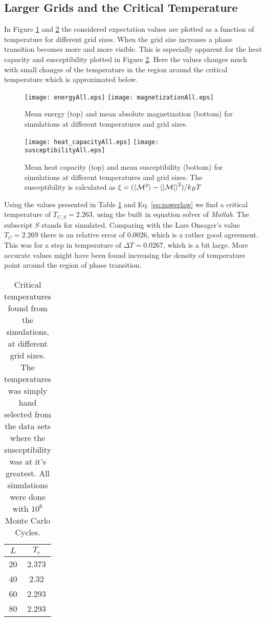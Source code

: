 \documentclass[11pt, a4paper]{article}
\begin{document}
\subsection{Larger Grids and the Critical Temperature}
In Figure \ref{fig:enmag} and \ref{fig:heatsus} the considered expectation values are plotted as a function of temperature for different grid sizes. When the grid size increases a phase transition becomes more and more visible. This is especially apparent for the heat capacity and susceptibility plotted in Figure \ref{fig:heatsus}. Here the values changes much with small changes of the temperature in the region around the critical temperature which is approximated below. 
\begin{figure}
\texttt{[image: energyAll.eps]}
\texttt{[image: magnetizationAll.eps]}
\caption{Mean energy (top) and mean absolute magnetization (bottom) for simulations at different temperatures and grid sizes.}
\label{fig:enmag}
\end{figure}

\begin{figure}
\texttt{[image: heat\_capacityAll.eps]}
\texttt{[image: susceptibilityAll.eps]}
\caption{Mean heat capacity (top) and mean susceptibility (bottom) for simulations at different temperatures and grid sizes. The susceptibility is calculated as $\xi = (\braket{{\cal M}^2} - \braket{|\cal M|}^2)/k_BT$}
\label{fig:heatsus}
\end{figure}

Using the values presented in Table \ref{tab:gridsizes} and Eq. \ref{eq:powerlaw} we find a critical temperature of $T_{C,S}=2.263$, using the built in equation solver of \textit{Matlab}. The subscript $S$ stands for simulated. Comparing with the Lars Onsager's value $T_C=2.269$ there is an relative error of 0.0026, which is a rather good agreement. This was for a step in temperature of $\Delta T=0.0267$, which is a bit large. More accurate values might have been found increasing the density of temperature point around the region of phase transition.
\begin{table}[!ht]
\centering
\begin{tabular}{c|c}
$L$ & $T_c$\\
\hline
20 & 2.373\\
40 & 2.32\\
60 & 2.293\\
80 & 2.293
\end{tabular}
\caption{Critical temperatures found from the simulations, at different grid sizes. The temperatures was simply hand selected from the data sets where the susceptibility was at it's greatest. All simulations were done with $10^6$ Monte Carlo Cycles.}
\label{tab:gridsizes}
\end{table}
\end{document}
